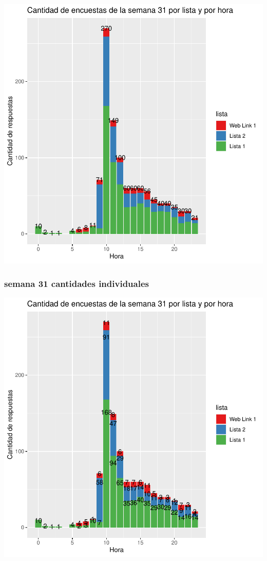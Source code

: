 \documentclass{article}
\begin{document}
\includegraphics{seguimientov5-014}

\subsubsection{semana 31 cantidades individuales}

\includegraphics{seguimientov5-015}
\end{document}
